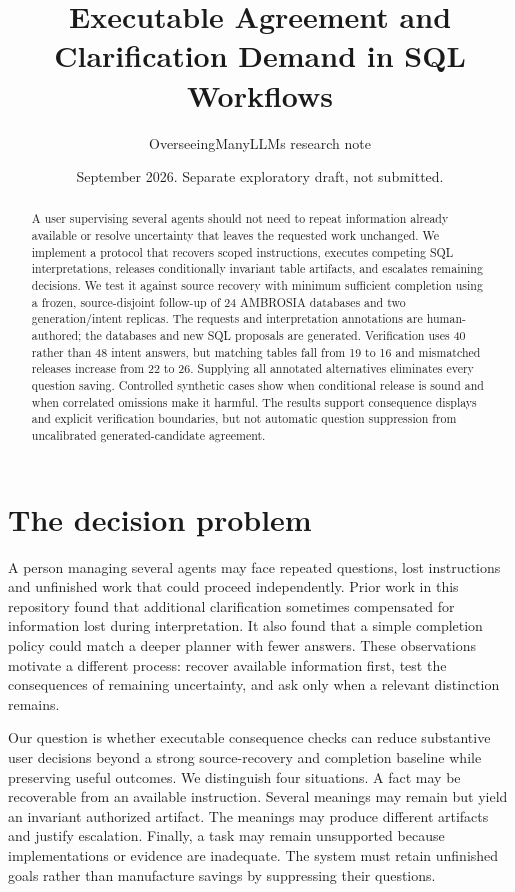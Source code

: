 \documentclass[11pt]{article}
\title{Executable Agreement and Clarification Demand in SQL Workflows}
\author{OverseeingManyLLMs research note}
\date{September 2026. Separate exploratory draft, not submitted.}
\begin{document}
\maketitle
\begin{abstract}
A user supervising several agents should not need to repeat information already available or resolve uncertainty that leaves the requested work unchanged. We implement a protocol that recovers scoped instructions, executes competing SQL interpretations, releases conditionally invariant table artifacts, and escalates remaining decisions. We test it against source recovery with minimum sufficient completion using a frozen, source-disjoint follow-up of 24 AMBROSIA databases and two generation/intent replicas. The requests and interpretation annotations are human-authored; the databases and new SQL proposals are generated. Verification uses 40 rather than 48 intent answers, but matching tables fall from 19 to 16 and mismatched releases increase from 22 to 26. Supplying all annotated alternatives eliminates every question saving. Controlled synthetic cases show when conditional release is sound and when correlated omissions make it harmful. The results support consequence displays and explicit verification boundaries, but not automatic question suppression from uncalibrated generated-candidate agreement.
\end{abstract}

\section{The decision problem}
A person managing several agents may face repeated questions, lost instructions and unfinished work that could proceed independently. Prior work in this repository found that additional clarification sometimes compensated for information lost during interpretation. It also found that a simple completion policy could match a deeper planner with fewer answers. These observations motivate a different process: recover available information first, test the consequences of remaining uncertainty, and ask only when a relevant distinction remains.

Our question is whether executable consequence checks can reduce substantive user decisions beyond a strong source-recovery and completion baseline while preserving useful outcomes. We distinguish four situations. A fact may be recoverable from an available instruction. Several meanings may remain but yield an invariant authorized artifact. The meanings may produce different artifacts and justify escalation. Finally, a task may remain unsupported because implementations or evidence are inadequate. The system must retain unfinished goals rather than manufacture savings by suppressing their questions.
\end{document}

